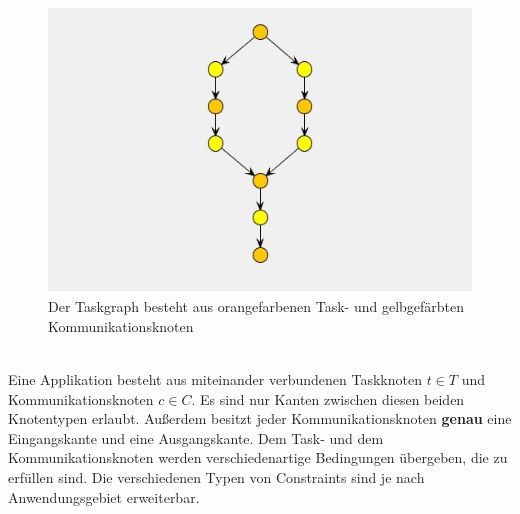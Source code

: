 \begin{figure}[H]\centering
  \includegraphics[width = 150mm]{bilder/taskgraph2.jpg}
  \caption{Der Taskgraph besteht aus orangefarbenen Task- und gelbgefärbten Kommunikationsknoten}\label{fig:taskgraph}
\end{figure}
\ \\
Eine Applikation besteht aus miteinander verbundenen Taskknoten $t \in T$ und Kommunikationsknoten $c \in C$. Es sind nur Kanten zwischen diesen beiden Knotentypen erlaubt. Außerdem besitzt jeder Kommunikationsknoten \textbf{genau} eine Eingangskante und eine Ausgangskante. Dem Task- und dem Kommunikationsknoten werden verschiedenartige Bedingungen übergeben, die zu erfüllen sind. Die verschiedenen Typen von Constraints sind je nach Anwendungsgebiet erweiterbar.

